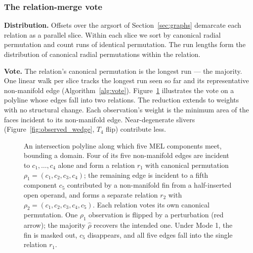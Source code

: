 \documentclass{egpubl}
\begin{document}
\subsubsection*{The relation-merge vote}

\textbf{Distribution.} Offsets over the argsort of Section~\ref{sec:graphs} demarcate each relation as a parallel slice. Within each slice we sort by canonical radial permutation and count runs of identical permutation. The run lengths form the distribution of canonical radial permutations within the relation.

\textbf{Vote.} The relation's canonical permutation is the longest run --- the majority. One linear walk per slice tracks the longest run seen so far and its representative non-manifold edge (Algorithm~\ref{alg:vote}). Figure~\ref{fig:relation_majority_vote} illustrates the vote on a polyline whose edges fall into two relations. The reduction extends to weights with no structural change. Each observation's weight is the minimum area of the faces incident to its non-manifold edge. Near-degenerate slivers (Figure~\ref{fig:observed_wedge}, $T_4$ flip) contribute less.

\begin{figure}[t]
\centering

\caption{An intersection polyline along which five MEL components meet, bounding a domain. Four of its five non-manifold edges are incident to $c_1, \ldots, c_4$ alone and form a relation $r_1$ with canonical permutation $\rho_1 = (c_1, c_2, c_3, c_4)$; the remaining edge is incident to a fifth component $c_5$ contributed by a non-manifold fin from a half-inserted open operand, and forms a separate relation $r_2$ with $\rho_2 = (c_1, c_2, c_3, c_4, c_5)$. Each relation votes its own canonical permutation. One $\rho_1$ observation is flipped by a perturbation (red arrow); the majority $\hat\rho$ recovers the intended one. Under Mode 1, the fin is masked out, $c_5$ disappears, and all five edges fall into the single relation $r_1$.}
\label{fig:relation_majority_vote}
\end{figure}
\end{document}

